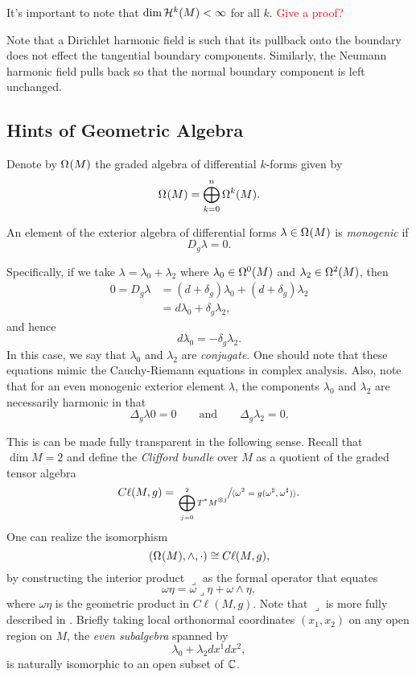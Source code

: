 \documentclass[12pt]{article}
\begin{document}
\begin{remark}
	It's important to note that $\dim \mathcal{H}_{}^{k}(M) < \infty$ for all $k$. \textcolor{red}{Give a proof?}
\end{remark}


\begin{remark}
	Note that a Dirichlet harmonic field is such that its pullback onto the boundary does not effect the tangential boundary components.  Similarly, the Neumann harmonic field pulls back so that the normal boundary component is left unchanged.
\end{remark}

\subsection{Hints of Geometric Algebra}

Denote by $\Omega_{}^{}(M)$ the graded algebra of differential $k$-forms given by
\[
\Omega_{}^{}(M) = \bigoplus_{k=0}^n \Omega_{}^{k}(M).
\]
\begin{definition}
An element of the exterior algebra of differential forms $\lambda\in \Omega_{}^{}(M)$ is \emph{monogenic} if 
\[
D_g \lambda  = 0.
\] 
\end{definition}

Specifically, if we take $\lambda = \lambda_0 + \lambda_2$ where $\lambda_0 \in \Omega_{}^{0}(M)$ and $\lambda_2 \in \Omega_{}^{2}(M)$, then
\begin{align*}
0=D_g \lambda &= (d+\delta_g) \lambda_0 + (d+\delta_g) \lambda_2 \\
&= d\lambda_0 + \delta_g \lambda_2,
\end{align*}
and hence
\[
d\lambda_0 = - \delta_g \lambda_2.
\]
In this case, we say that $\lambda_0$ and $\lambda_2$ are \emph{conjugate}.  One should note that these equations mimic the Cauchy-Riemann equations in complex analysis.  Also, note that for an even  monogenic exterior element $\lambda$, the components $\lambda_0$ and $\lambda_2$ are necessarily harmonic in that
\[
\Delta_g \lambda 0 = 0 \qquad \textrm{and} \qquad \Delta_g \lambda_2 = 0.
\]

This is can be made fully transparent in the following sense.  Recall that $\dim M = 2$ and define the \emph{Clifford bundle} over $M$ as a quotient of the graded tensor algebra
\[
C\ell(M,g) = \sfrac{\bigoplus_{j=0}^2 T^*M^{\otimes j}}{\langle \omega^2 = g(\omega^\sharp,\omega^\sharp)\rangle}.
\]
One can realize the isomorphism 
\[
(\Omega_{}^{}(M),\wedge,\cdot) \cong C\ell(M,g),
\]
by constructing the interior product $\lrcorner$ as the formal operator that equates
\[
\omega \eta = \omega \lrcorner \eta + \omega \wedge \eta,
\]
where $\omega \eta$ is the geometric product in $C\ell(M,g)$.  Note that $\lrcorner$ is more fully described in \cite{dirac-spectral}. Briefly taking local orthonormal coordinates $(x_1,x_2)$ on any open region on $M$, the \emph{even subalgebra} spanned by
\[
\lambda_0 + \lambda_2 dx^1 dx^2,
\]
is naturally isomorphic to an open subset of $\mathbb{C}$.  
\end{document}
